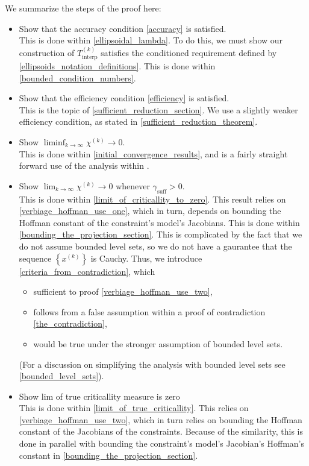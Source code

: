 \documentclass{article}
\theoremstyle{case}
\numberwithin{theorem}{subsection}
\newcommand{\chik}{{\chi^{(k)}}}
\newcommand{\gammabi}{\gamma_{\textrm{suff}}}
\newcommand{\sampletrk}{{T_{\text{interp}}^{(k)}}}
\newcommand{\xk}{x^{(k)}}
\begin{document}
We summarize the steps of the proof here:
\begin{itemize}
\item Show that the accuracy condition \cref{accuracy} is satisfied. \\
This is done within \cref{ellipsoidal_lambda}. 
To do this, we must show our construction of $\sampletrk$ satisfies the conditioned requirement defined by \cref{ellipsoids_notation_definitions}.
This is done within \cref{bounded_condition_numbers}.
\item Show that the efficiency condition \cref{efficiency} is satisfied. \\
This is the topic of \cref{sufficient_reduction_section}.
We use a slightly weaker efficiency condition, as stated in \cref{sufficient_reduction_theorem}.
\item Show $\liminf_{k\to\infty} \chik \to 0$. \\
This is done within \cref{initial_convergence_results}, and is a fairly straight forward use of the analysis within \cite{Conejo:2013:GCT:2620806.2621814}.
\item Show $\lim_{k\to\infty} \chik \to 0$ whenever $\gammabi > 0$. \\
This is done within \cref{limit_of_criticallity_to_zero}.
This result relies on \cref{verbiage_hoffman_use_one}, which in turn, depends on bounding the Hoffman constant of the constraint's model's Jacobians.
This is done within \cref{bounding_the_projection_section}.
This is complicated by the fact that we do not assume bounded level sets, so we do not have a gaurantee that the sequence $\left\{\xk\right\}$ is Cauchy.
Thus, we introduce \cref{criteria_from_contradiction}, which
\begin{itemize}
\item sufficient to proof \cref{verbiage_hoffman_use_two},
\item follows from a false assumption within a proof of contradiction \cref{the_contradiction},
\item would be true under the stronger assumption of bounded level sets.
\end{itemize}
(For a discussion on simplifying the analysis with bounded level sets see \cref{bounded_level_sets}).
\item Show lim of true criticallity measure is zero \\
This is done within \cref{limit_of_true_criticallity}.
This relies on \cref{verbiage_hoffman_use_two}, which in turn relies on bounding the Hoffman constant of the Jacobians of the constraints.
Because of the similarity, this is done in parallel with bounding the constraint's model's Jacobian's Hoffman's constant in \cref{bounding_the_projection_section}.
\end{itemize}
\end{document}
